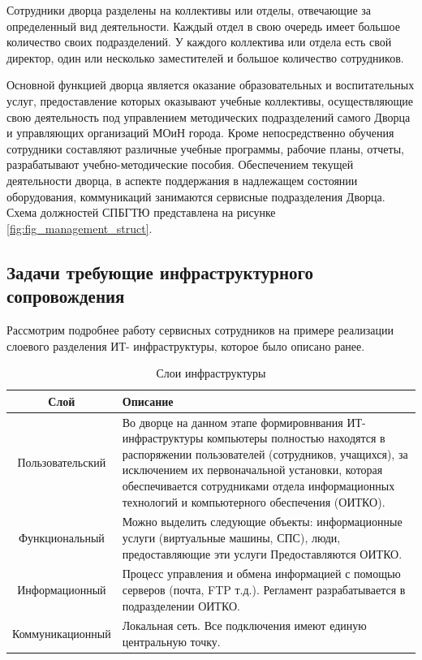 \documentclass[utf8,usehyperref,12pt]{G7-32}
\begin{document}
Сотрудники дворца разделены на коллективы или отделы, отвечающие за определенный вид деятельности. 
Каждый отдел в свою очередь имеет большое количество своих подразделений. У каждого коллектива или отдела есть свой директор, один или несколько заместителей и большое количество сотрудников.

Основной функцией дворца является оказание образовательных и воспитательных услуг, предоставление которых оказывают учебные коллективы, осуществляющие свою деятельность под управлением методических подразделений самого Дворца
и управляющих организаций МОиН города. Кроме непосредственно обучения сотрудники  составляют различные учебные программы, рабочие планы, отчеты, разрабатывают учебно-методические пособия.
Обеспечением текущей деятельности дворца, в аспекте поддержания в надлежащем состоянии оборудования, коммуникаций занимаются сервисные подразделения Дворца. Схема должностей СПБГТЮ представлена на рисунке 
\ref{fig:fig_management_struct}.

\subsection{Задачи требующие инфраструктурного сопровождения}
Рассмотрим подробнее работу сервисных сотрудников на примере реализации слоевого разделения ИТ- инфраструктуры, которое было описано ранее.

\begin{table}[ht]
  \centering %
  \caption{Слои инфраструктуры}\label{tab:tab1}
\begin{tabular}{|c|p{130mm}|}
\hline Слой & Описание \\ 
\hline Пользовательский & Во дворце на данном этапе формировнвания ИТ-инфраструктуры компьютеры полностью находятся в распоряжении пользователей  (сотрудников, учащихся), за исключением их первоначальной установки, которая обеспечивается сотрудниками отдела информационных технологий и компьютерного обеспечения (ОИТКО). \\ 
\hline Функциональный & Можно выделить следующие объекты:
информационные услуги (виртуальные машины, СПС), 
люди, предоставляющие эти услуги
Предоставляются ОИТКО. \\ 
\hline Информационный & Процесс управления и обмена информацией с помощью серверов (почта, FTP  т.д.). Регламент разрабатывается в подразделении ОИТКО. \\ 
\hline Коммуникационный & Локальная сеть. Все подключения имеют единую центральную точку. \\ 
\hline 
\end{tabular} 
\end{table}
\end{document}
